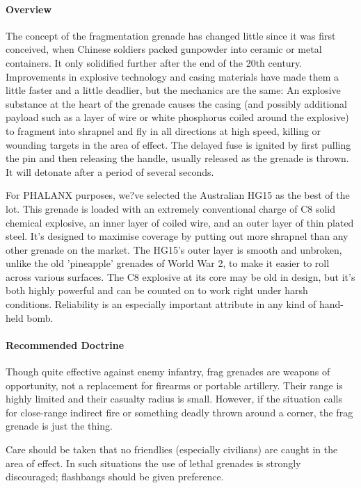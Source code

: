 \paragraph*{Overview}
The concept of the fragmentation grenade has changed little since it was first conceived, when Chinese soldiers packed gunpowder into ceramic or metal containers. It only solidified further after the end of the 20th century. Improvements in explosive technology and casing materials have made them a little faster and a little deadlier, but the mechanics are the same: An explosive substance at the heart of the grenade causes the casing (and possibly additional payload such as a layer of wire or white phosphorus coiled around the explosive) to fragment into shrapnel and fly in all directions at high speed, killing or wounding targets in the area of effect. The delayed fuse is ignited by first pulling the pin and then releasing the handle, usually released as the grenade is thrown. It will detonate after a period of several seconds.

For PHALANX purposes, we?ve selected the Australian HG15 as the best of the lot. This grenade is loaded with an extremely conventional charge of C8 solid chemical explosive, an inner layer of coiled wire, and an outer layer of thin plated steel. It's designed to maximise coverage by putting out more shrapnel than any other grenade on the market. The HG15's outer layer is smooth and unbroken, unlike the old 'pineapple' grenades of World War 2, to make it easier to roll across various surfaces. The C8 explosive at its core may be old in design, but it's both highly powerful and can be counted on to work right under harsh conditions. Reliability is an especially important attribute in any kind of hand-held bomb.
\paragraph*{Recommended Doctrine}
Though quite effective against enemy infantry, frag grenades are weapons of opportunity, not a replacement for firearms or portable artillery. Their range is highly limited and their casualty radius is small. However, if the situation calls for close-range indirect fire or something deadly thrown around a corner, the frag grenade is just the thing.

Care should be taken that no friendlies (especially civilians) are caught in the area of effect. In such situations the use of lethal grenades is strongly discouraged; flashbangs should be given preference.

